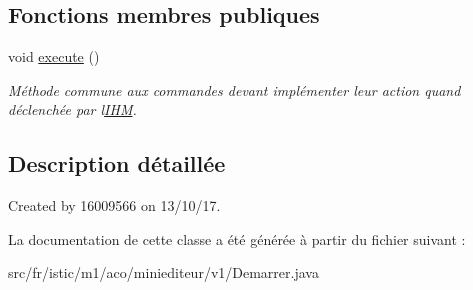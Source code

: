 \subsection*{Fonctions membres publiques}
\begin{DoxyCompactItemize}
\item 
\mbox{\label{classfr_1_1istic_1_1m1_1_1aco_1_1miniediteur_1_1v1_1_1Demarrer_a1de3c107a8ee460c70a5b98e6b7edd69}} 
void \hyperlink{classfr_1_1istic_1_1m1_1_1aco_1_1miniediteur_1_1v1_1_1Demarrer_a1de3c107a8ee460c70a5b98e6b7edd69}{execute} ()
\begin{DoxyCompactList}\small\item\em Méthode commune aux commandes devant implémenter leur action quand déclenchée par l\textquotesingle{}\hyperlink{interfacefr_1_1istic_1_1m1_1_1aco_1_1miniediteur_1_1v1_1_1IHM}{I\+HM}. \end{DoxyCompactList}\end{DoxyCompactItemize}


\subsection{Description détaillée}
Created by 16009566 on 13/10/17. 

La documentation de cette classe a été générée à partir du fichier suivant \+:\begin{DoxyCompactItemize}
\item 
src/fr/istic/m1/aco/miniediteur/v1/Demarrer.\+java\end{DoxyCompactItemize}
